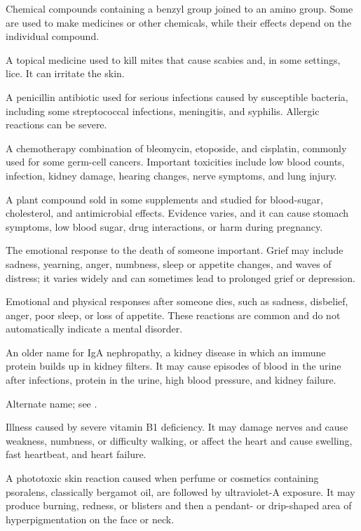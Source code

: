  Chemical compounds containing a benzyl group joined to an amino group. Some are used to make medicines or other chemicals, while their effects depend on the individual compound.

 A topical medicine used to kill mites that cause scabies and, in some settings, lice. It can irritate the skin.

 A penicillin antibiotic used for serious infections caused by susceptible bacteria, including some streptococcal infections, meningitis, and syphilis. Allergic reactions can be severe.

 A chemotherapy combination of bleomycin, etoposide, and
cisplatin, commonly used for some germ-cell cancers. Important toxicities
include low blood counts, infection, kidney damage, hearing changes, nerve
symptoms, and lung injury.

 A plant compound sold in some supplements and studied for blood-sugar, cholesterol, and antimicrobial effects. Evidence varies, and it can cause stomach symptoms, low blood sugar, drug interactions, or harm during pregnancy.

 The emotional response to the death of someone important. Grief may include sadness, yearning, anger, numbness, sleep or appetite changes, and waves of distress; it varies widely and can sometimes lead to prolonged grief or depression.

 Emotional and physical responses after someone dies, such as sadness, disbelief, anger, poor sleep, or loss of appetite. These reactions are common and do not automatically indicate a mental disorder.

 An older name for IgA nephropathy, a kidney disease in which an immune protein builds up in kidney filters. It may cause episodes of blood in the urine after infections, protein in the urine, high blood pressure, and kidney failure.

 Alternate name; see .

 Illness caused by severe vitamin B1 deficiency. It may damage nerves and cause weakness, numbness, or difficulty walking, or affect the heart and cause swelling, fast heartbeat, and heart failure.

 A phototoxic skin reaction caused when perfume or cosmetics containing psoralens, classically bergamot oil, are followed by ultraviolet-A exposure. It may produce burning, redness, or blisters and then a pendant- or drip-shaped area of hyperpigmentation on the face or neck.

